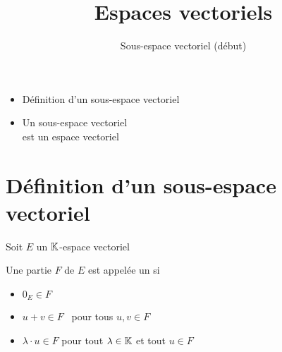 







\title{{\bf Espaces vectoriels}}
\subtitle{Sous-espace vectoriel (début)}

\begin{frame}
  
  \debutmontitre

  \pause

{\footnotesize
\hfill
{}
\begin{minipage}{0.6\textwidth}
  \begin{itemize}
    \item<3-> Définition d'un sous-espace vectoriel
    \item<4-> Un sous-espace vectoriel \\ est un espace vectoriel  
  \end{itemize}
\end{minipage}
}

\end{frame}

\setcounter{framenumber}{0}


\section{Définition d'un sous-espace vectoriel}

\begin{frame}
Soit $E$ un $\mathbb{K}$-espace vectoriel
\begin{mydefinition} 
Une partie  $F$ de $E$ est appelée un  si  
 \begin{itemize}
   \item $0_E \in F$
   
   \item $u+v \in F$ \  pour tous $u,v \in F$
   
   \item $\lambda \cdot u \in F$ pour tout $\lambda \in \mathbb{K}$ et tout $u \in F$ 
 \end{itemize}
\end{mydefinition}

\end{frame}

